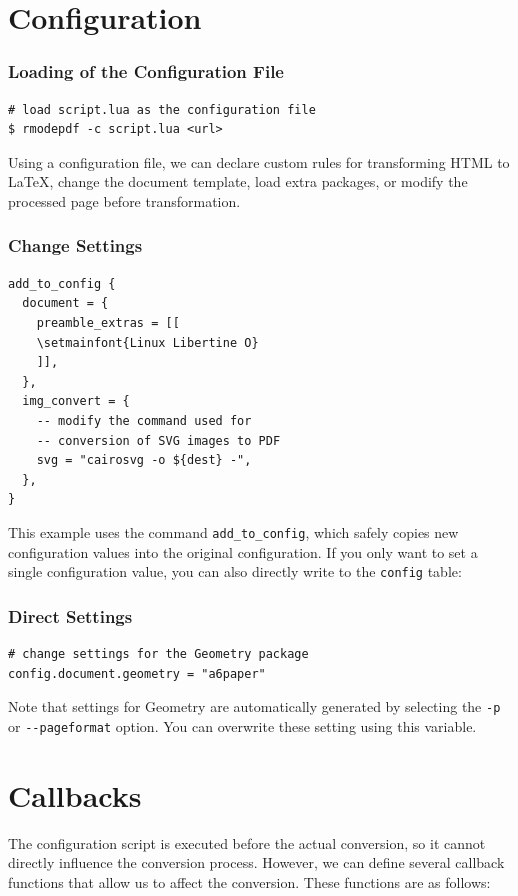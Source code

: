 \section{Configuration}

\begin{frame}[fragile]
  \frametitle{Loading of the Configuration File}

\begin{verbatim}
# load script.lua as the configuration file
$ rmodepdf -c script.lua <url>
\end{verbatim}
\end{frame}

Using a configuration file, we can declare custom rules for transforming HTML
to \LaTeX, change the document template, load extra packages, or modify the
processed page before transformation.


\begin{frame}[fragile]
  \frametitle{Change Settings}
\begin{verbatim}
add_to_config {
  document = {
    preamble_extras = [[
    \setmainfont{Linux Libertine O}
    ]],
  },
  img_convert = {
    -- modify the command used for 
    -- conversion of SVG images to PDF
    svg = "cairosvg -o ${dest} -",
  },
}
\end{verbatim}


\end{frame}

This example uses the command \texttt{add\_to\_config}, which safely copies new
configuration values into the original configuration. If you only want to set a
single configuration value, you can also directly write to the \texttt{config}
table:

\begin{frame}[fragile]
  \frametitle{Direct Settings}
\begin{verbatim}
# change settings for the Geometry package
config.document.geometry = "a6paper"
\end{verbatim}
\end{frame}

Note that settings for Geometry are automatically generated by selecting the
\verb|-p| or \verb|--pageformat| option. You can overwrite these setting using 
this variable.

\section{Callbacks}

The configuration script is executed before the actual conversion, so it cannot
directly influence the conversion process. However, we can define several
callback functions that allow us to affect the conversion. These functions are
as follows:

